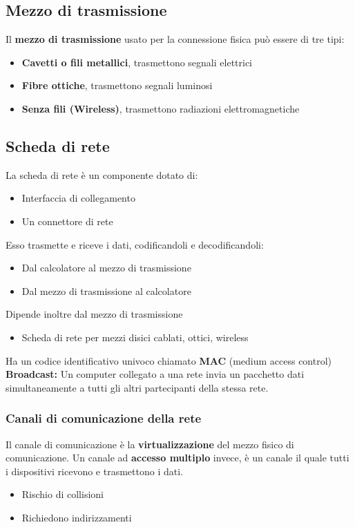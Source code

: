 \documentclass{article}
\begin{document}
\subsection{Mezzo di trasmissione}
Il \textbf{mezzo di trasmissione} usato per la connessione fisica può essere di tre tipi:
\begin{itemize}
    \item \textbf{Cavetti o fili metallici}, trasmettono segnali elettrici
    \item \textbf{Fibre ottiche}, trasmettono segnali luminosi
    \item \textbf{Senza fili (Wireless)}, trasmettono radiazioni elettromagnetiche
\end{itemize}

\subsection{Scheda di rete}
La scheda di rete è un componente dotato di:
\begin{itemize}
    \item Interfaccia di collegamento
    \item Un connettore di rete
\end{itemize}
Esso trasmette e riceve i dati, codificandoli e decodificandoli:
\begin{itemize}
    \item Dal calcolatore al mezzo di trasmissione
    \item Dal mezzo di trasmissione al calcolatore
\end{itemize}
Dipende inoltre dal mezzo di trasmissione
\begin{itemize}
    \item Scheda di rete per mezzi disici cablati, ottici, wireless
\end{itemize}
Ha un codice identificativo univoco chiamato \textbf{MAC} (medium access control)\\
\textbf{Broadcast:} Un computer collegato a una rete invia un pacchetto dati simultaneamente a tutti gli altri partecipanti della stessa rete.

\subsubsection{Canali di comunicazione della rete}
Il canale di comunicazione è la \textbf{virtualizzazione} del mezzo fisico di comunicazione. Un canale ad \textbf{accesso multiplo} invece, è un canale il quale tutti i dispositivi ricevono e trasmettono i dati.
\begin{itemize}
    \item Rischio di collisioni
    \item Richiedono indirizzamenti
\end{itemize}
\end{document}
